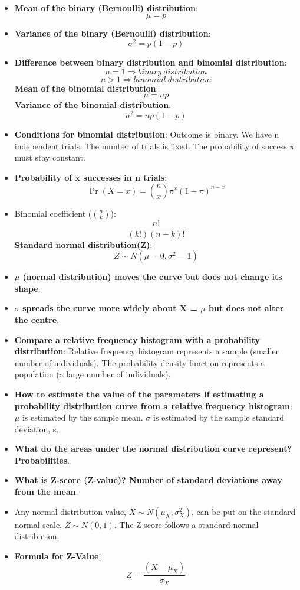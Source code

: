 \documentclass[12pt]{book}
\begin{document}
\begin{itemize}
\item \textbf{Mean of the binary (Bernoulli) distribution}: $$\mu = p$$
\item \textbf{Variance of the binary (Bernoulli) distribution}: $$\sigma^2 = p (1 - p)$$
\item \textbf{Difference between binary distribution and binomial distribution}: $$n = 1 \Rightarrow binary \ distribution$$
$$n > 1 \Rightarrow binomial \ distribution$$
\textbf{Mean of the binomial distribution}:$$\mu=np$$
\textbf{Variance of the binomial distribution}:$$\sigma^2 = np(1-p)$$
\item \textbf{Conditions for binomial distribution}: Outcome is binary. We have n independent trials. The number of trials is fixed. The probability of success $\pi$ must stay constant.
\item \textbf{Probability of x successes in n trials}: $$ \Pr(X = x) = \binom{n}{x} \pi^x (1 - \pi)^{n - x} $$
\item Binomial coefficient ($\binom{n}{k}$): $$\frac{n!}{(k!)(n-k)!}$$
\textbf{Standard normal distribution(Z)}:$$Z \sim N (\mu = 0 ,\sigma^2 = 1)$$
\item \textbf{$\mu$ (normal distribution) moves the curve but does not change its shape}.
\item \textbf{$\sigma$ spreads the curve more widely about X = $\mu$ but does not alter the centre}.
\item \textbf{Compare a relative frequency histogram with a probability distribution}: Relative frequency histogram represents a sample (smaller number of individuals). The probability density function represents a population (a large number of individuals).
\item \textbf{How to estimate the value of the parameters if estimating a probability distribution curve from a relative frequency histogram}: $\mu$ is estimated by the sample mean. $\sigma$ is estimated by the sample standard deviation, s.
\item \textbf{What do the areas under the normal distribution curve represent? Probabilities}.
\item \textbf{What is Z-score (Z-value)? Number of standard deviations away from the mean}.
\item Any normal distribution value, \textbf{$X \sim N(\mu_X , \sigma^2_X)$}, can be put on the standard normal scale, \textbf{$Z \sim N(0, 1)$}. The Z-score follows a standard normal distribution.
\item \textbf{Formula for Z-Value}: $$Z = \frac{(X - \mu_X)}{\sigma_X}$$

\end{itemize}
\end{document}
